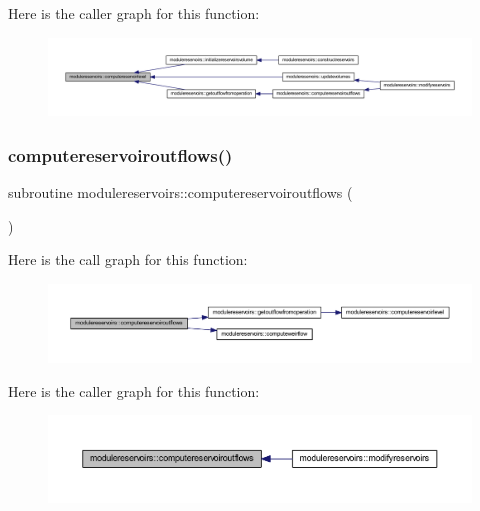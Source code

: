 Here is the caller graph for this function\+:\nopagebreak
\begin{figure}[H]
\begin{center}
\leavevmode
\includegraphics[width=350pt]{namespacemodulereservoirs_a473bf29bfb29eda6a398dead645aec5a_icgraph}
\end{center}
\end{figure}
\mbox{\label{namespacemodulereservoirs_a20b9abb4646405dacdb0a0927de2ec9b}} 
\subsubsection{\texorpdfstring{computereservoiroutflows()}{computereservoiroutflows()}}
{\footnotesize\ttfamily subroutine modulereservoirs\+::computereservoiroutflows (\begin{DoxyParamCaption}{ }\end{DoxyParamCaption})\hspace{0.3cm}{\ttfamily [private]}}

Here is the call graph for this function\+:\nopagebreak
\begin{figure}[H]
\begin{center}
\leavevmode
\includegraphics[width=350pt]{namespacemodulereservoirs_a20b9abb4646405dacdb0a0927de2ec9b_cgraph}
\end{center}
\end{figure}
Here is the caller graph for this function\+:\nopagebreak
\begin{figure}[H]
\begin{center}
\leavevmode
\includegraphics[width=350pt]{namespacemodulereservoirs_a20b9abb4646405dacdb0a0927de2ec9b_icgraph}
\end{center}
\end{figure}
\mbox{\label{namespacemodulereservoirs_ae746634227400b0849469114a5dc5c3f}} 
